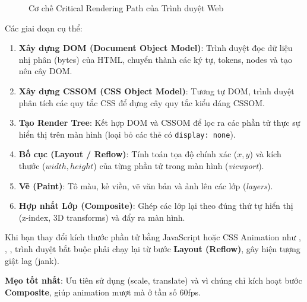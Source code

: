 \begin{figure}[H]
\begin{tcolorbox}
{%
    }
    \end{tcolorbox}
    \vspace{-2pt}
    \caption{Cơ chế Critical Rendering Path của Trình duyệt Web}
    \label{fig:crp_process}
\end{figure}

Các giai đoạn cụ thể:
\begin{enumerate}
    \item \textbf{Xây dựng DOM (Document Object Model)}: Trình duyệt đọc dữ liệu nhị phân (bytes) của HTML, chuyển thành các ký tự, tokens, nodes và tạo nên cây DOM.
    \item \textbf{Xây dựng CSSOM (CSS Object Model)}: Tương tự DOM, trình duyệt phân tích các quy tắc CSS để dựng cây quy tắc kiểu dáng CSSOM.
    \item \textbf{Tạo Render Tree}: Kết hợp DOM và CSSOM để lọc ra các phần tử thực sự hiển thị trên màn hình (loại bỏ các thẻ có \texttt{display: none}).
    \item \textbf{Bố cục (Layout / Reflow)}: Tính toán tọa độ chính xác ($x, y$) và kích thước ($width, height$) của từng phần tử trong màn hình (\textit{viewport}).
    \item \textbf{Vẽ (Paint)}: Tô màu, kẻ viền, vẽ văn bản và ảnh lên các lớp (\textit{layers}).
    \item \textbf{Hợp nhất Lớp (Composite)}: Ghép các lớp lại theo đúng thứ tự hiển thị (z-index, 3D transforms) và đẩy ra màn hình.
\end{enumerate}

\begin{warnBox}
Khi bạn thay đổi kích thước phần tử bằng JavaScript hoặc CSS Animation như , , , trình duyệt bắt buộc phải chạy lại từ bước \textbf{Layout (Reflow)}, gây hiện tượng giật lag (jank). 

\textbf{Mẹo tốt nhất}: Ưu tiên sử dụng  (scale, translate) và  vì chúng chỉ kích hoạt bước \textbf{Composite}, giúp animation mượt mà ở tần số 60fps.
\end{warnBox}

